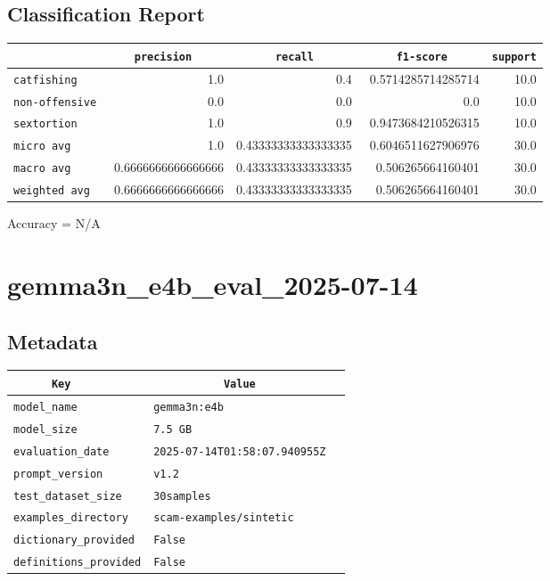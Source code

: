 \documentclass{article}
\begin{document}
\subsection{Classification Report}

\begin{center}
\begin{tabular}{l | r | r | r | r} \hline
    \verb|            | & \verb|    precision     | & \verb|      recall      | & \verb|     f1-score     | & \verb|support| \\ \hline
    \hline
    \verb|catfishing | & 1.0 & 0.4 & 0.5714285714285714 &    10.0 \\ \hline
    \verb|non-offensive| & 0.0 & 0.0 & 0.0 &    10.0 \\ \hline
    \verb|sextortion | & 1.0 & 0.9 & 0.9473684210526315 &    10.0 \\ \hline
    \verb|micro avg  | & 1.0 & 0.43333333333333335 & 0.6046511627906976 &    30.0 \\ \hline
    \verb|macro avg  | & 0.6666666666666666 & 0.43333333333333335 & 0.506265664160401 &    30.0 \\ \hline
    \verb|weighted avg| & 0.6666666666666666 & 0.43333333333333335 & 0.506265664160401 &    30.0 \\ \hline
\end{tabular}
\end{center}

\begin{center}
Accuracy = N/A
\end{center}

\section{gemma3n\_e4b\_eval\_2025-07-14}
\subsection{Metadata}

\begin{center}
\begin{tabular}{l | l} \hline
    \verb|      Key      | & \verb|           Value           | \\ \hline
    \hline
    \verb|model_name    | & \verb|gemma3n:e4b                  | \\ \hline
    \verb|model_size    | & \verb|7.5 GB                       | \\ \hline
    \verb|evaluation_date| & \verb|2025-07-14T01:58:07.940955Z  | \\ \hline
    \verb|prompt_version| & \verb|v1.2                         | \\ \hline
    \verb|test_dataset_size| & \verb|30samples                    | \\ \hline
    \verb|examples_directory| & \verb|scam-examples/sintetic       | \\ \hline
    \verb|dictionary_provided| & \verb|False                        | \\ \hline
    \verb|definitions_provided| & \verb|False                        | \\ \hline
\end{tabular}
\end{center}
\end{document}

